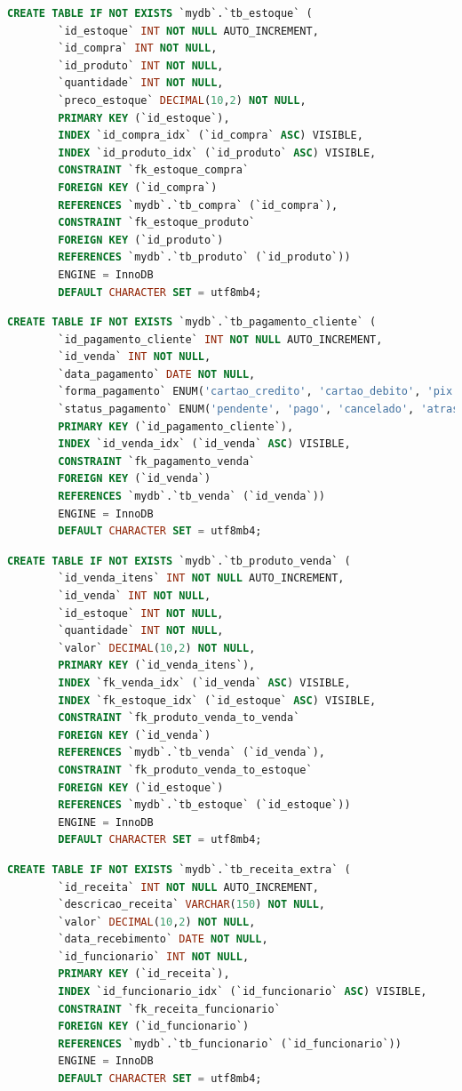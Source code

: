 \documentclass[
12pt,
a4paper,
semrecuonosumario,
sumario = abnt-6027-2012]{report}
\begin{document}
    \begin{lstlisting}[language=SQL,caption={DDL -- Tabela \texttt{tb\_estoque}}]
		CREATE TABLE IF NOT EXISTS `mydb`.`tb_estoque` (
		`id_estoque` INT NOT NULL AUTO_INCREMENT,
		`id_compra` INT NOT NULL,
		`id_produto` INT NOT NULL,
		`quantidade` INT NOT NULL,
		`preco_estoque` DECIMAL(10,2) NOT NULL,
		PRIMARY KEY (`id_estoque`),
		INDEX `id_compra_idx` (`id_compra` ASC) VISIBLE,
		INDEX `id_produto_idx` (`id_produto` ASC) VISIBLE,
		CONSTRAINT `fk_estoque_compra`
		FOREIGN KEY (`id_compra`)
		REFERENCES `mydb`.`tb_compra` (`id_compra`),
		CONSTRAINT `fk_estoque_produto`
		FOREIGN KEY (`id_produto`)
		REFERENCES `mydb`.`tb_produto` (`id_produto`))
		ENGINE = InnoDB
		DEFAULT CHARACTER SET = utf8mb4;
    \end{lstlisting}
    \begin{lstlisting}[language=SQL,caption={DDL -- Tabela \texttt{tb\_pagamento\_cliente}}]
		CREATE TABLE IF NOT EXISTS `mydb`.`tb_pagamento_cliente` (
		`id_pagamento_cliente` INT NOT NULL AUTO_INCREMENT,
		`id_venda` INT NOT NULL,
		`data_pagamento` DATE NOT NULL,
		`forma_pagamento` ENUM('cartao_credito', 'cartao_debito', 'pix', 'boleto', 'dinheiro') NOT NULL,
		`status_pagamento` ENUM('pendente', 'pago', 'cancelado', 'atrasado') NOT NULL,
		PRIMARY KEY (`id_pagamento_cliente`),
		INDEX `id_venda_idx` (`id_venda` ASC) VISIBLE,
		CONSTRAINT `fk_pagamento_venda`
		FOREIGN KEY (`id_venda`)
		REFERENCES `mydb`.`tb_venda` (`id_venda`))
		ENGINE = InnoDB
		DEFAULT CHARACTER SET = utf8mb4;
    \end{lstlisting}
    \begin{lstlisting}[language=SQL,caption={DDL -- Tabela \texttt{tb\_produto\_venda}}]
		CREATE TABLE IF NOT EXISTS `mydb`.`tb_produto_venda` (
		`id_venda_itens` INT NOT NULL AUTO_INCREMENT,
		`id_venda` INT NOT NULL,
		`id_estoque` INT NOT NULL,
		`quantidade` INT NOT NULL,
		`valor` DECIMAL(10,2) NOT NULL,
		PRIMARY KEY (`id_venda_itens`),
		INDEX `fk_venda_idx` (`id_venda` ASC) VISIBLE,
		INDEX `fk_estoque_idx` (`id_estoque` ASC) VISIBLE,
		CONSTRAINT `fk_produto_venda_to_venda`
		FOREIGN KEY (`id_venda`)
		REFERENCES `mydb`.`tb_venda` (`id_venda`),
		CONSTRAINT `fk_produto_venda_to_estoque`
		FOREIGN KEY (`id_estoque`)
		REFERENCES `mydb`.`tb_estoque` (`id_estoque`))
		ENGINE = InnoDB
		DEFAULT CHARACTER SET = utf8mb4;
    \end{lstlisting}
    \begin{lstlisting}[language=SQL,caption={DDL -- Tabela \texttt{tb\_receita\_extra}}]
		CREATE TABLE IF NOT EXISTS `mydb`.`tb_receita_extra` (
		`id_receita` INT NOT NULL AUTO_INCREMENT,
		`descricao_receita` VARCHAR(150) NOT NULL,
		`valor` DECIMAL(10,2) NOT NULL,
		`data_recebimento` DATE NOT NULL,
		`id_funcionario` INT NOT NULL,
		PRIMARY KEY (`id_receita`),
		INDEX `id_funcionario_idx` (`id_funcionario` ASC) VISIBLE,
		CONSTRAINT `fk_receita_funcionario`
		FOREIGN KEY (`id_funcionario`)
		REFERENCES `mydb`.`tb_funcionario` (`id_funcionario`))
		ENGINE = InnoDB
		DEFAULT CHARACTER SET = utf8mb4;
	\end{lstlisting}
\end{document}
